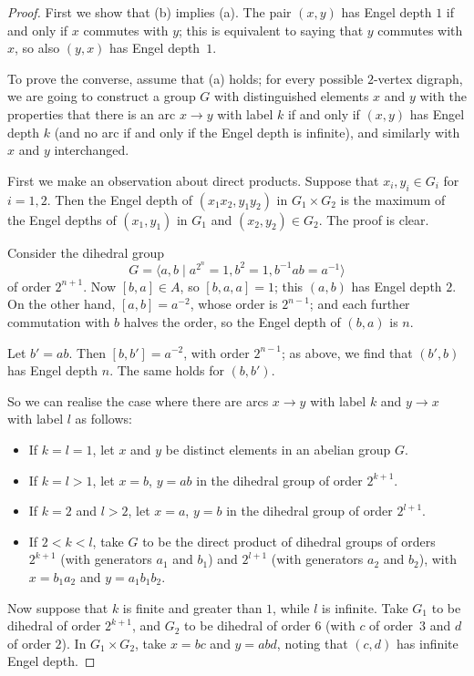 \documentclass[10pt,a4paper]{amsart}
\begin{document}
\begin{proof}
First we show that (b) implies (a). The pair $(x,y)$ has Engel
depth $1$ if and only if $x$ commutes with $y$; this is equivalent to saying
that $y$ commutes with $x$, so also $(y,x)$ has Engel depth~$1$.

\medskip

To prove the converse, assume that (a) holds; for every possible $2$-vertex
digraph, we are going to construct a group $G$ with distinguished elements
$x$ and $y$ with the properties that there is an arc $x\to y$ with label $k$
if and only if $(x,y)$ has Engel depth $k$ (and no arc if and only if the
Engel depth is infinite), and similarly with $x$ and $y$ interchanged.

First we make an observation about direct products. Suppose that
$x_i,y_i\in G_i$ for $i=1,2$. Then the Engel depth of $(x_1x_2,y_1y_2)$
in $G_1\times G_2$ is the maximum of the Engel depths of $(x_1,y_1)$ in $G_1$
and $(x_2,y_2)\in G_2$. The proof is clear.

Consider the dihedral group 
\[G=\langle a,b\mid a^{2^n}=1,b^2=1,b^{-1}ab=a^{-1}\rangle\]
of order $2^{n+1}$. Now $[b,a]\in A$, so $[b,a,a]=1$; this $(a,b)$ has
Engel depth $2$. On the other hand, $[a,b]=a^{-2}$, whose order is
$2^{n-1}$; and each further commutation with $b$ halves the order, so the
Engel depth of $(b,a)$ is $n$.

Let $b'=ab$. Then $[b,b']=a^{-2}$, with order $2^{n-1}$; as above, we find
that $(b',b)$ has Engel depth $n$. The same holds for $(b,b')$.

So we can realise the case where there are arcs $x\to y$ with label $k$ and
$y\to x$ with label $l$ as follows:
\begin{itemize}
\item If $k=l=1$, let $x$ and $y$ be distinct elements in an abelian group $G$.
\item If $k=l>1$, let $x=b$, $y=ab$ in the dihedral group of order $2^{k+1}$.
\item If $k=2$ and $l>2$, let $x=a$, $y=b$ in the dihedral group of order
$2^{l+1}$.
\item If $2<k<l$, take $G$ to be the direct product of dihedral groups of orders
$2^{k+1}$ (with generators $a_1$ and $b_1$) and $2^{l+1}$ (with generators
$a_2$ and $b_2$), with $x=b_1a_2$ and $y=a_1b_1b_2$.
\end{itemize}

Now suppose that $k$ is finite and greater than $1$, while $l$ is infinite.
Take $G_1$ to be dihedral of order $2^{k+1}$, and $G_2$ to be dihedral of 
order $6$ (with $c$ of order~$3$ and $d$ of order $2$). In $G_1\times G_2$,
take $x=bc$ and $y=abd$, noting that $(c,d)$ has infinite Engel depth.


\end{proof}
\end{document}

